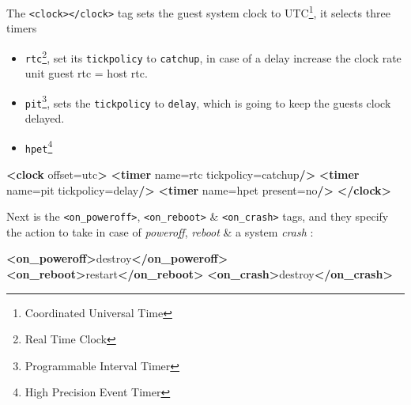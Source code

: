 \documentclass[
  14pt,
  english,
  a4paper,
]{scrreprt}
\newenvironment{Shaded}{}{}
\newcommand{\KeywordTok}[1]{\textcolor[rgb]{0.00,0.44,0.13}{\textbf{#1}}}
\newcommand{\NormalTok}[1]{#1}
\newcommand{\OtherTok}[1]{\textcolor[rgb]{0.00,0.44,0.13}{#1}}
\newcommand{\StringTok}[1]{\textcolor[rgb]{0.25,0.44,0.63}{#1}}
\providecommand{\tightlist}{%
  \setlength{\itemsep}{0pt}\setlength{\parskip}{0pt}}
\begin{document}
The
\texttt{\textless{}clock\textgreater{}\textless{}/clock\textgreater{}}
tag sets the guest system clock to UTC\footnote{Coordinated Universal
  Time}, it selects three timers

\begin{itemize}
\tightlist
\item
  \texttt{rtc}\footnote{Real Time Clock}, set its \texttt{tickpolicy} to
  \texttt{catchup}, in case of a delay increase the clock rate unit
  guest rtc = host rtc.
\item
  \texttt{pit}\footnote{Programmable Interval Timer}, sets the
  \texttt{tickpolicy} to \texttt{delay}, which is going to keep the
  guests clock delayed.
\item
  \texttt{hpet}\footnote{High Precision Event Timer}
\end{itemize}

\begin{Shaded}
\begin{Highlighting}[]
  \KeywordTok{\textless{}clock}\OtherTok{ offset=}\StringTok{\textquotesingle{}utc\textquotesingle{}}\KeywordTok{\textgreater{}}
    \KeywordTok{\textless{}timer}\OtherTok{ name=}\StringTok{\textquotesingle{}rtc\textquotesingle{}}\OtherTok{ tickpolicy=}\StringTok{\textquotesingle{}catchup\textquotesingle{}}\KeywordTok{/\textgreater{}}
    \KeywordTok{\textless{}timer}\OtherTok{ name=}\StringTok{\textquotesingle{}pit\textquotesingle{}}\OtherTok{ tickpolicy=}\StringTok{\textquotesingle{}delay\textquotesingle{}}\KeywordTok{/\textgreater{}}
    \KeywordTok{\textless{}timer}\OtherTok{ name=}\StringTok{\textquotesingle{}hpet\textquotesingle{}}\OtherTok{ present=}\StringTok{\textquotesingle{}no\textquotesingle{}}\KeywordTok{/\textgreater{}}
  \KeywordTok{\textless{}/clock\textgreater{}}
\end{Highlighting}
\end{Shaded}

Next is the \texttt{\textless{}on\_poweroff\textgreater{}},
\texttt{\textless{}on\_reboot\textgreater{}} \&
\texttt{\textless{}on\_crash\textgreater{}} tags, and they specify the
action to take in case of \emph{poweroff}, \emph{reboot} \& a system
\emph{crash} :

\begin{Shaded}
\begin{Highlighting}[]
  \KeywordTok{\textless{}on\_poweroff\textgreater{}}\NormalTok{destroy}\KeywordTok{\textless{}/on\_poweroff\textgreater{}}
  \KeywordTok{\textless{}on\_reboot\textgreater{}}\NormalTok{restart}\KeywordTok{\textless{}/on\_reboot\textgreater{}}
  \KeywordTok{\textless{}on\_crash\textgreater{}}\NormalTok{destroy}\KeywordTok{\textless{}/on\_crash\textgreater{}}
\end{Highlighting}
\end{Shaded}
\end{document}
